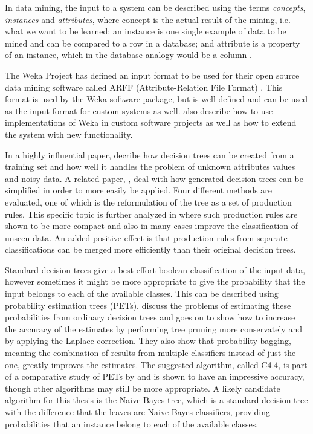 \documentclass[a4paper]{article}
\begin{document}
In data mining, the input to a system can be described using the terms \emph{concepts}, \emph{instances} and \emph{attributes},
where concept is the actual result of the mining, i.e. what we want to be learned; an instance is one single example of data to be
mined and can be compared to a row in a database; and attribute is a property of an instance, which in the database analogy would
be a column \citep{Witten2011}.

The Weka Project has defined an input format to be used for their open source data mining software called ARFF (Attribute-Relation
File Format) \citep{Garner1995, Witten2011}. This format is used by the Weka software package, but is well-defined and can be used
as the input format for custom systems as well. \citet{Witten2011} also describe how to use implementations of Weka in custom
software projects as well as how to extend the system with new functionality.

In a highly influential paper, \citet{Quinlan1986} decribe how decision trees can be created from a training set and how well it
handles the problem of unknown attributes values and noisy data. A related paper, \citet{Quinlan1987}, deal with how generated
decision trees can be simplified in order to more easily be applied. Four different methods are evaluated, one of which is the
reformulation of the tree as a set of production rules. This specific topic is further analyzed in \citet{Quinlan1987b} where such
production rules are shown to be more compact and also in many cases improve the classification of unseen data. An added positive
effect is that production rules from separate classifications can be merged more efficiently than their original decision trees.

Standard decision trees give a best-effort boolean classification of the input data, however sometimes it might be more
appropriate to give the probability that the input belongs to each of the available classes. This can be described using
probability estimation trees (PETs). \citet{Provost2003} discuss the problems of estimating these probabilities from ordinary
decision trees and goes on to show how to increase the accuracy of the estimates by performing tree pruning more conservately and
by applying the Laplace correction.  They also show that probability-bagging, meaning the combination of results from multiple
classifiers instead of just the one, greatly improves the estimates. The suggested algorithm, called C4.4, is part of a
comparative study of PETs by \citet{Chu2011} and is shown to have an impressive accuracy, though other algorithms may still be
more appropriate. A likely candidate algorithm for this thesis is the Naive Bayes tree, which is a standard decision tree with the
difference that the leaves are Naive Bayes classifiers, providing probabilities that an instance belong to each of the available
classes.
\end{document}
